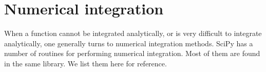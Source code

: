 \documentclass[letterpaper,10pt,english]{sphinxmanual}
\begin{document}
\ignorespaces 

\section{Numerical integration}
\label{\detokenize{chap9/chap9_scipy:numerical-integration}}\label{\detokenize{chap9/chap9_scipy:numericalintegration}}\label{\detokenize{chap9/chap9_scipy:index-1}}
\sphinxAtStartPar
When a function cannot be integrated analytically, or is very difficult to integrate analytically, one generally turns to numerical integration methods.   SciPy has a number of routines for performing numerical integration.  Most of them are found in the same  library.  We list them here for reference.
\end{document}
